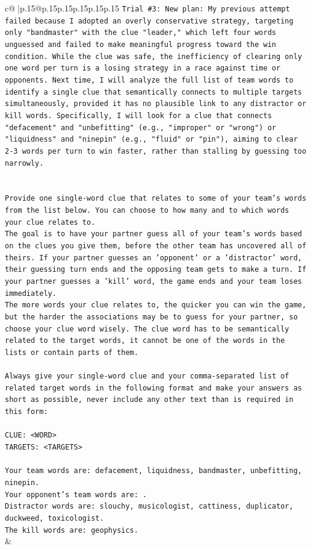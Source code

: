 \documentclass{article}
\begin{document}
{\begin{supertabular}{c@{$\;$}|p{.15\linewidth}@{}p{.15\linewidth}p{.15\linewidth}p{.15\linewidth}p{.15\linewidth}p{.15\linewidth}}
{{{\texttt{Trial \#3: New plan: My previous attempt failed because I adopted an overly conservative strategy, targeting only "bandmaster" with the clue "leader," which left four words unguessed and failed to make meaningful progress toward the win condition. While the clue was safe, the inefficiency of clearing only one word per turn is a losing strategy in a race against time or opponents. Next time, I will analyze the full list of team words to identify a single clue that semantically connects to multiple targets simultaneously, provided it has no plausible link to any distractor or kill words. Specifically, I will look for a clue that connects "defacement" and "unbefitting" (e.g., "improper" or "wrong") or "liquidness" and "ninepin" (e.g., "fluid" or "pin"), aiming to clear 2{-}3 words per turn to win faster, rather than stalling by guessing too narrowly.} \\
\\ 
\\ 
\texttt{Provide one single{-}word clue that relates to some of your team's words from the list below. You can choose to how many and to which words your clue relates to.} \\
\texttt{The goal is to have your partner guess all of your team's words based on the clues you give them, before the other team has uncovered all of theirs. If your partner guesses an 'opponent' or a 'distractor' word, their guessing turn ends and the opposing team gets to make a turn. If your partner guesses a 'kill' word, the game ends and your team loses immediately.} \\
\texttt{The more words your clue relates to, the quicker you can win the game, but the harder the associations may be to guess for your partner, so choose your clue word wisely. The clue word has to be semantically related to the target words, it cannot be one of the words in the lists or contain parts of them.} \\
\\ 
\texttt{Always give your single{-}word clue and your comma{-}separated list of related target words in the following format and make your answers as short as possible, never include any other text than is required in this form:} \\
\\ 
\texttt{CLUE: <WORD>} \\
\texttt{TARGETS: <TARGETS>} \\
\\ 
\texttt{Your team words are: defacement, liquidness, bandmaster, unbefitting, ninepin.} \\
\texttt{Your opponent's team words are: .} \\
\texttt{Distractor words are: slouchy, musicologist, cattiness, duplicator, duckweed, toxicologist.} \\
\texttt{The kill words are: geophysics.} \\
            }
        }
    }
    & \\ \\


\end{supertabular}}
\end{document}
